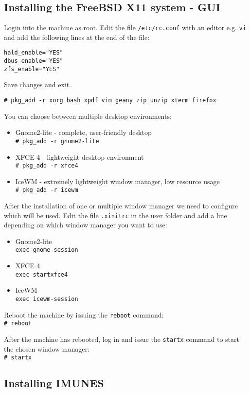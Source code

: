 \subsection{Installing the FreeBSD X11 system - GUI}

Login into the machine as root. Edit the file \texttt{/etc/rc.conf} with an editor e.g.
\texttt{vi} and add the following lines at the end of the file:
\begin{verbatim}
hald_enable="YES"
dbus_enable="YES"
zfs_enable="YES"
\end{verbatim}
Save changes and exit.

\texttt{\# pkg\_add -r xorg bash xpdf vim geany zip unzip xterm firefox}

You can choose between multiple desktop environments:
\begin{itemize}
\item Gnome2-lite - complete, user-friendly desktop\\
\texttt{\# pkg\_add -r gnome2-lite}
\item XFCE 4 - lightweight desktop environment\\
\texttt{\# pkg\_add -r xfce4}
\item IceWM - extremely lightweight window manager, low resource usage\\
\texttt{\# pkg\_add -r icewm}
\end{itemize}

After the installation of one or multiple window manager we need to configure
which will be used. Edit the file \texttt{.xinitrc} in the user folder and add a line
depending on which window manager you want to use:
\begin{itemize}
\item Gnome2-lite\\
\texttt{exec gnome-session}
\item XFCE 4\\
\texttt{exec startxfce4}
\item IceWM\\
\texttt{exec icewm-session}
\end{itemize}

Reboot the machine by issuing the \texttt{reboot} command:\\
\texttt{\# reboot}

After the machine has rebooted, log in and issue the \texttt{startx} command to
start the chosen window manager:\\
\texttt{\# startx}

\subsection{Installing IMUNES}

